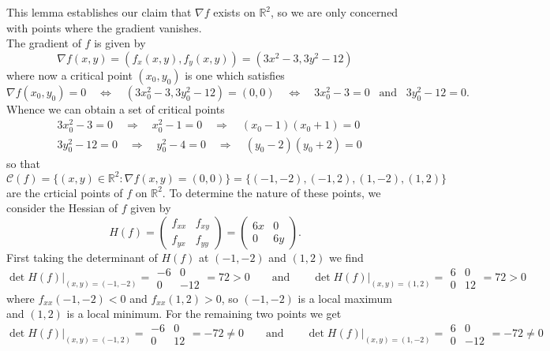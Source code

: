 \documentclass[11pt, letterpaper]{article}
\newcommand{\mbb}[1]{\mathbb{#1}}
\newcommand{\mc}[1]{\mathcal{#1}}
\begin{document}
    This lemma establishes our claim that $\nabla f$ exists on $\mbb{R}^2$, so we are only concerned with points where the gradient vanishes.\\[10pt]
    The gradient of $f$ is given by 
    \[\nabla f(x,y)=(f_x(x,y),f_y(x,y))=(3x^2-3,3y^2-12)\]
    where now a critical point $(x_0,y_0)$ is one which satisfies
    \[\nabla f(x_0,y_0)=0\quad\Leftrightarrow\quad(3x_0^2-3,3y_0^2-12)=(0,0)\quad\Leftrightarrow\quad 3x_0^2-3=0\;\;\;\text{and}\;\;\;3y_0^2-12=0.\]
    Whence we can obtain a set of critical points
    \begin{align*}
        &3x_0^2-3=0\quad\Rightarrow\quad x_0^2-1=0\quad\Rightarrow\quad (x_0-1)(x_0+1)=0\\
        &3y_0^2-12=0\quad\Rightarrow\quad y_0^2-4=0\quad\Rightarrow\quad (y_0-2)(y_0+2)=0
    \end{align*}
    so that $\mc{C}(f)=\{(x,y)\in\mbb{R}^2:\nabla f(x,y)=(0,0)\}=\{(-1, -2),(-1, 2), (1, -2), (1,2)\}$ are the crticial points of $f$ on $\mbb{R}^2$.
    To determine the nature of these points, we consider the Hessian of $f$ given by
    \[H(f)=\begin{pmatrix}
        f_{xx} & f_{xy}\\
        f_{yx} & f_{yy}
    \end{pmatrix}=\begin{pmatrix}
        6x & 0 \\
        0 & 6y
    \end{pmatrix}.\]
    First taking the determinant of $H(f)$ at $(-1, -2)$ and $(1,2)$ we find
    \[\det H(f)\big|_{(x,y)=(-1,-2)}=\begin{array}{|cc|}
        -6 & 0 \\
        0 & -12
    \end{array}=72>0\qquad\text{and}\qquad \det H(f)\big|_{(x,y)=(1,2)}=\begin{array}{|cc|}
        6 & 0\\
        0 & 12
    \end{array}=72>0\]
    where $f_{xx}(-1, -2)<0$ and $f_{xx}(1, 2)>0$, so $(-1, -2)$ is a local maximum and $(1,2)$ is a local minimum. For the remaining two points we get
    \[\det H(f)\big|_{(x,y)=(-1,2)}=\begin{array}{|cc|}
        -6 & 0 \\
        0 & 12
    \end{array}=-72\neq0\qquad\text{and}\qquad \det H(f)\big|_{(x,y)=(1,-2)}=\begin{array}{|cc|}
        6 & 0\\
        0 & -12
    \end{array}=-72\neq0\]
\end{document}
